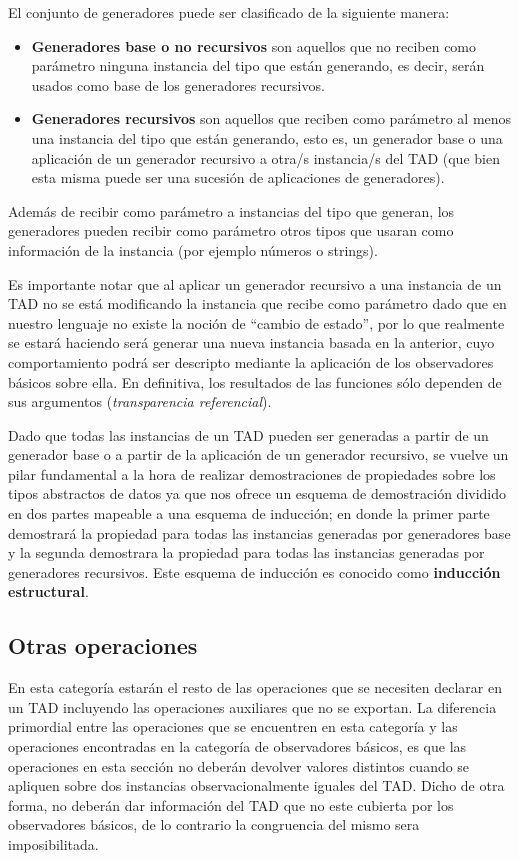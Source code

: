 El conjunto de generadores puede ser clasificado de la siguiente manera:
\begin{itemize}
 \item \textbf{Generadores base o no recursivos} son aquellos que no reciben como par\'ametro ninguna instancia del tipo que est\'an generando, es decir, ser\'an usados como base de los generadores recursivos.
 \item \textbf{Generadores recursivos} son aquellos que reciben como par\'ametro al menos una instancia del tipo que est\'an generando, esto es, un generador base o una aplicaci\'on de un generador recursivo a otra/s instancia/s del TAD (que bien esta misma puede ser una sucesi\'on de aplicaciones de generadores).
\end{itemize}
Adem\'as de recibir como par\'ametro a instancias del tipo que generan, los generadores pueden recibir como par\'ametro otros tipos que usaran como informaci\'on de la instancia (por ejemplo n\'umeros o strings).

Es importante notar que al aplicar un generador recursivo a una instancia de un TAD no se est\'a modificando la instancia que recibe como par\'ametro dado que en nuestro lenguaje no existe la noci\'on de ``cambio de estado'', por lo que realmente se estar\'a haciendo ser\'a generar una nueva instancia basada en la anterior, cuyo comportamiento podr\'a ser descripto mediante la aplicaci\'on de los observadores b\'asicos sobre ella. En definitiva, los resultados de las funciones s\'olo dependen de sus argumentos (\textit{transparencia referencial}).

Dado que todas las instancias de un TAD pueden ser generadas a partir de un generador base o a partir de la aplicaci\'on de un generador recursivo, se vuelve un pilar fundamental a la hora de realizar demostraciones de propiedades sobre los tipos abstractos de datos ya que nos ofrece un esquema de demostraci\'on dividido en dos partes mapeable a una esquema de inducci\'on; en donde la primer parte demostrar\'a la propiedad para todas las instancias generadas por generadores base y la segunda demostrara la propiedad para todas las instancias generadas por generadores recursivos. Este esquema de inducci\'on es conocido como \textbf{inducci\'on estructural}.

\subsection{Otras operaciones}

En esta categor\'ia estar\'an el resto de las operaciones que se necesiten declarar en un TAD incluyendo las operaciones auxiliares que no se exportan. La diferencia primordial entre las operaciones que se encuentren en esta categor\'ia y las operaciones encontradas en la categor\'ia de observadores b\'asicos, es que las operaciones en esta secci\'on no deber\'an devolver valores distintos cuando se apliquen sobre dos instancias observacionalmente iguales del TAD. Dicho de otra forma, no deber\'an dar informaci\'on del TAD que no este cubierta por los observadores b\'asicos, de lo contrario la congruencia del mismo sera imposibilitada.

